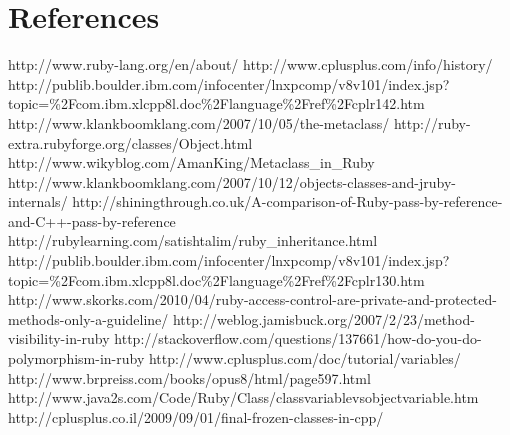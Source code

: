 \documentclass[10pt,a4paper,twocolumn]{article}
\begin{document}
\section{References}
http://www.ruby-lang.org/en/about/
http://www.cplusplus.com/info/history/
http://publib.boulder.ibm.com/infocenter/lnxpcomp/v8v101/index.jsp?topic=\%2Fcom.ibm.xlcpp8l.doc\%2Flanguage\%2Fref\%2Fcplr142.htm
http://www.klankboomklang.com/2007/10/05/the-metaclass/
http://ruby-extra.rubyforge.org/classes/Object.html
http://www.wikyblog.com/AmanKing/Metaclass_in_Ruby
http://www.klankboomklang.com/2007/10/12/objects-classes-and-jruby-internals/
http://shiningthrough.co.uk/A-comparison-of-Ruby-pass-by-reference-and-C++-pass-by-reference
http://rubylearning.com/satishtalim/ruby_inheritance.html
http://publib.boulder.ibm.com/infocenter/lnxpcomp/v8v101/index.jsp?topic=\%2Fcom.ibm.xlcpp8l.doc\%2Flanguage\%2Fref\%2Fcplr130.htm
http://www.skorks.com/2010/04/ruby-access-control-are-private-and-protected-methods-only-a-guideline/
http://weblog.jamisbuck.org/2007/2/23/method-visibility-in-ruby
http://stackoverflow.com/questions/137661/how-do-you-do-polymorphism-in-ruby
http://www.cplusplus.com/doc/tutorial/variables/
http://www.brpreiss.com/books/opus8/html/page597.html
http://www.java2s.com/Code/Ruby/Class/classvariablevsobjectvariable.htm
http://cplusplus.co.il/2009/09/01/final-frozen-classes-in-cpp/
\end{document}
